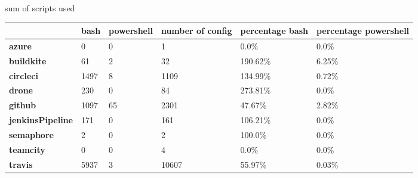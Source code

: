

\caption{sum of scripts used}
\label{table:scripts used}
\begin{tabular}{|l|l|l|l|l|l|}
\hline
{} &  bash &  powershell &  number of config & percentage bash & percentage powershell \\ \hline

\textbf{azure          } &     0 &           0 &                 1 &            0.0\% &                  0.0\% \\ \hline
\textbf{buildkite      } &    61 &           2 &                32 &         190.62\% &                 6.25\% \\ \hline
\textbf{circleci       } &  1497 &           8 &              1109 &         134.99\% &                 0.72\% \\ \hline
\textbf{drone          } &   230 &           0 &                84 &         273.81\% &                  0.0\% \\ \hline
\textbf{github         } &  1097 &          65 &              2301 &          47.67\% &                 2.82\% \\ \hline
\textbf{jenkinsPipeline} &   171 &           0 &               161 &         106.21\% &                  0.0\% \\ \hline
\textbf{semaphore      } &     2 &           0 &                 2 &          100.0\% &                  0.0\% \\ \hline
\textbf{teamcity       } &     0 &           0 &                 4 &            0.0\% &                  0.0\% \\ \hline
\textbf{travis         } &  5937 &           3 &             10607 &          55.97\% &                 0.03\% \\ \hline

\end{tabular}

